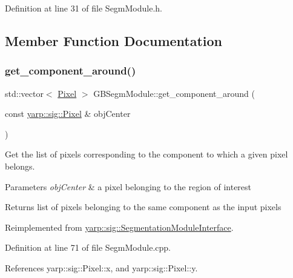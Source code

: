 Definition at line 31 of file Segm\+Module.\+h.



\subsection{Member Function Documentation}
\mbox{\label{classGBSegmModule_a0b63c53513e67c4f126e29cf7f28ad53}} 
\subsubsection{\texorpdfstring{get\+\_\+component\+\_\+around()}{get\_component\_around()}}
{\footnotesize\ttfamily std\+::vector$<$ \hyperlink{classyarp_1_1sig_1_1Pixel}{Pixel} $>$ G\+B\+Segm\+Module\+::get\+\_\+component\+\_\+around (\begin{DoxyParamCaption}\item[{const \hyperlink{classyarp_1_1sig_1_1Pixel}{yarp\+::sig\+::\+Pixel} \&}]{obj\+Center }\end{DoxyParamCaption})\hspace{0.3cm}{\ttfamily [virtual]}}



Get the list of pixels corresponding to the component to which a given pixel belongs. 


\begin{DoxyParams}{Parameters}
{\em obj\+Center} & a pixel belonging to the region of interest \\
\hline
\end{DoxyParams}
\begin{DoxyReturn}{Returns}
list of pixels belonging to the same component as the input pixels 
\end{DoxyReturn}


Reimplemented from \hyperlink{classyarp_1_1sig_1_1SegmentationModuleInterface_a9bf0b95fbab216b2284122b0b8a36820}{yarp\+::sig\+::\+Segmentation\+Module\+Interface}.



Definition at line 71 of file Segm\+Module.\+cpp.



References yarp\+::sig\+::\+Pixel\+::x, and yarp\+::sig\+::\+Pixel\+::y.


